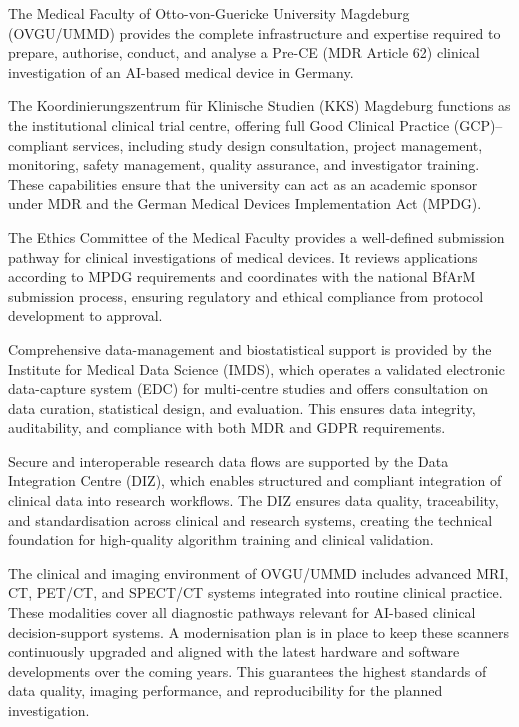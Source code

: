 \documentclass[11pt, a4paper]{article}
\begin{document}
The Medical Faculty of Otto-von-Guericke University Magdeburg (OVGU/UMMD) provides the complete infrastructure and expertise required to prepare, authorise, conduct, and analyse a Pre-CE (MDR Article 62) clinical investigation of an AI-based medical device in Germany.

The Koordinierungszentrum für Klinische Studien (KKS) Magdeburg functions as the institutional clinical trial centre, offering full Good Clinical Practice (GCP)–compliant services, including study design consultation, project management, monitoring, safety management, quality assurance, and investigator training. These capabilities ensure that the university can act as an academic sponsor under MDR and the German Medical Devices Implementation Act (MPDG).

The Ethics Committee of the Medical Faculty provides a well-defined submission pathway for clinical investigations of medical devices. It reviews applications according to MPDG requirements and coordinates with the national BfArM submission process, ensuring regulatory and ethical compliance from protocol development to approval.

Comprehensive data-management and biostatistical support is provided by the Institute for Medical Data Science (IMDS), which operates a validated electronic data-capture system (EDC) for multi-centre studies and offers consultation on data curation, statistical design, and evaluation. This ensures data integrity, auditability, and compliance with both MDR and GDPR requirements.

Secure and interoperable research data flows are supported by the Data Integration Centre (DIZ), which enables structured and compliant integration of clinical data into research workflows. The DIZ ensures data quality, traceability, and standardisation across clinical and research systems, creating the technical foundation for high-quality algorithm training and clinical validation.

The clinical and imaging environment of OVGU/UMMD includes advanced MRI, CT, PET/CT, and SPECT/CT systems integrated into routine clinical practice. These modalities cover all diagnostic pathways relevant for AI-based clinical decision-support systems. A modernisation plan is in place to keep these scanners continuously upgraded and aligned with the latest hardware and software developments over the coming years. This guarantees the highest standards of data quality, imaging performance, and reproducibility for the planned investigation.
\end{document}
